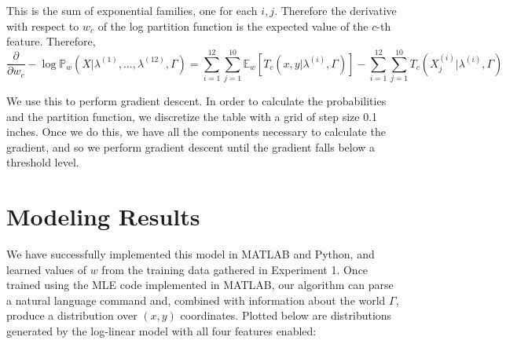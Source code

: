 \documentclass[12pt,letterpaper]{article}
\newcommand\prob{\mathbb{P}}
\newcommand\E{\mathbb{E}}
\begin{document}
This is the sum of exponential families, one for each $i, j$. Therefore the derivative with respect to $w_c$ of the log partition function is the expected value of the $c$-th feature. Therefore, 
\[
\frac{\partial}{\partial w_c} -\log\prob_w(X|\lambda^{(1)}, \ldots, \lambda^{(12)}, \Gamma) = \sum_{i = 1}^{12}\sum_{j = 1}^{10} \E_w[T_c(x, y|\lambda^{(i)}, \Gamma)] - \sum_{i = 1}^{12}\sum_{j = 1}^{10}T_c(X^{(i)}_j|\lambda^{(i)}, \Gamma)
\]

We use this to perform gradient descent. In order to calculate the probabilities and the partition function, we discretize the table with a grid of step size 0.1 inches. Once we do this, we have all the components necessary to calculate the gradient, and so we perform gradient descent until the gradient falls below a threshold level.

\section{Modeling Results}

We have successfully implemented this model in MATLAB and Python, and learned values of $w$ from the training data gathered in Experiment 1. Once trained using the MLE code implemented in MATLAB, our algorithm can parse a natural language command and, combined with information about the world $\Gamma$, produce a distribution over $(x, y)$ coordinates. Plotted below are distributions generated by the log-linear model with all four features enabled:
\end{document}
